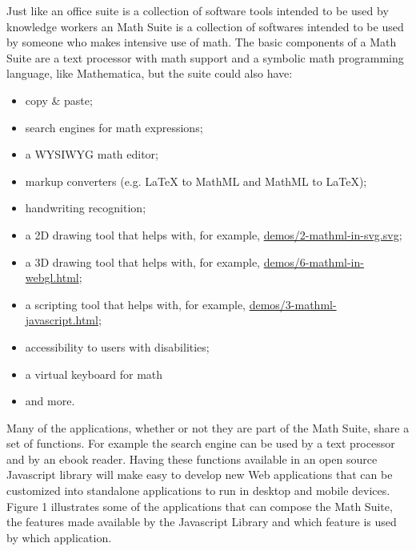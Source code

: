 Just like an office suite is a collection of software tools
intended to be used by
knowledge workers an Math Suite is a collection of softwares intended to be used
by someone who makes intensive use of math. The basic components of a Math
Suite are a text processor with math support and a symbolic math programming
language, like Mathematica, but the suite could also have:
\begin{itemize}
  \item copy \& paste;
  \item search engines for math expressions;
  \item a WYSIWYG math editor;
  \item markup converters (e.g. LaTeX to MathML and MathML to LaTeX);
  \item handwriting recognition;
  \item a 2D drawing tool that helps with, for example,
    \href{http://fred-wang.github.io/MathUI2014/demos/2-mathml-in-svg.svg}{demos/2-mathml-in-svg.svg};
  \item a 3D drawing tool that helps with, for example,
    \href{http://fred-wang.github.io/MathUI2014/demos/6-mathml-in-webgl.html}{demos/6-mathml-in-webgl.html};
  \item a scripting tool that helps with, for example,
    \href{http://fred-wang.github.io/MathUI2014/demos/3-mathml-javascript.html}{demos/3-mathml-javascript.html};
  \item accessibility to users with disabilities;
  \item a virtual keyboard for math
  \item and more.
\end{itemize}

Many of the applications, whether or not they are part of the Math Suite,
share a set of functions. For
example the search engine can be used by a text processor and by an ebook
reader. Having
these functions available in an open source Javascript library will make easy to
develop new Web applications that can be customized into standalone applications
to run in desktop and mobile devices. Figure 1 illustrates some of the
applications that can compose the Math Suite, the features made available by the
Javascript Library and which feature is used by which application.

